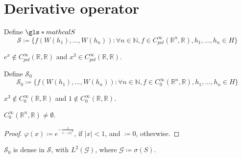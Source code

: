 \chapter{Derivative operator}

\begin{notation} Define 
$\gls*{mathcalS}$
\[\mathcal{S} \coloneqq 
\{f(W(h_1), \dots, W(h_n)) : \forall n \in \mathbb{N}, f \in C_{pol}^{\infty}(\mathbb{R}^n, \mathbb{R}), h_1, \dots, h_n \in H
\}\]
\end{notation}

\begin{example}
$e^x \notin C_{pol}^{\infty}(\mathbb{R}, \mathbb{R})$
and $x^3 \in C_{pol}^{\infty}(\mathbb{R}, \mathbb{R})$. 
\end{example}

\begin{notation} Define $\mathcal{S}_{0}$
\[\mathcal{S}_{0} \coloneqq 
\{f(W(h_1), \dots, W(h_n)) : \forall n \in \mathbb{N}, f \in C_{0}^{\infty}(\mathbb{R}^n, \mathbb{R}), h_1, \dots, h_n \in H
\}\]
\end{notation}

\begin{example}
$x^3 \notin C_{0}^{\infty}(\mathbb{R}, \mathbb{R})$
and $1 \notin C_{0}^{\infty}(\mathbb{R}, \mathbb{R})$. 
\end{example}

\begin{proposition}
\label{proposition:smoothing varphi}
$C_{0}^{\infty}(\mathbb{R}^n, \mathbb{R}) \neq \emptyset$. 
\end{proposition}

\begin{proof}
$\varphi(x) \coloneqq e^{- \frac{1}{1- \lvert x \rvert^2}} $, 
if $\lvert x \rvert < 1$, 
and $\coloneqq 0$, otherwise. 
\end{proof}

\begin{lemma}
$\mathcal{S}_{0}$ is dense in $\mathcal{S}$, with $L^2(\mathcal{G})$, where $\mathcal{G} \coloneqq \sigma(S)$. 
\end{lemma}

